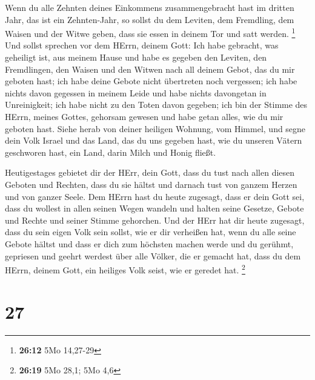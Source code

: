  Wenn du alle Zehnten deines Einkommens zusammengebracht
hast im dritten Jahr, das ist ein Zehnten-Jahr, so sollst du dem
Leviten, dem Fremdling, dem Waisen und der Witwe geben, dass sie essen
in deinem Tor und satt werden. \footnote{\textbf{26:12} 5Mo 14,27-29}
 Und sollst sprechen vor dem HErrn, deinem Gott: Ich habe
gebracht, was geheiligt ist, aus meinem Hause und habe es gegeben den
Leviten, den Fremdlingen, den Waisen und den Witwen nach all deinem
Gebot, das du mir geboten hast; ich habe deine Gebote nicht übertreten
noch vergessen;  ich habe nichts davon gegessen in meinem
Leide und habe nichts davongetan in Unreinigkeit; ich habe nicht zu den
Toten davon gegeben; ich bin der Stimme des HErrn, meines Gottes,
gehorsam gewesen und habe getan alles, wie du mir geboten hast.
 Siehe herab von deiner heiligen Wohnung, vom Himmel, und
segne dein Volk Israel und das Land, das du uns gegeben hast, wie du
unseren Vätern geschworen hast, ein Land, darin Milch und Honig fließt.

 Heutigestages gebietet dir der HErr, dein Gott, dass du
tust nach allen diesen Geboten und Rechten, dass du sie hältst und
darnach tust von ganzem Herzen und von ganzer Seele.  Dem
HErrn hast du heute zugesagt, dass er dein Gott sei, dass du wollest in
allen seinen Wegen wandeln und halten seine Gesetze, Gebote und Rechte
und seiner Stimme gehorchen.  Und der HErr hat dir heute
zugesagt, dass du sein eigen Volk sein sollst, wie er dir verheißen hat,
wenn du alle seine Gebote hältst  und dass er dich zum
höchsten machen werde und du gerühmt, gepriesen und geehrt werdest über
alle Völker, die er gemacht hat, dass du dem HErrn, deinem Gott, ein
heiliges Volk seist, wie er geredet hat. \footnote{\textbf{26:19} 5Mo
  28,1; 5Mo 4,6}

\hypertarget{section-6}{%
\section{27}\label{section-6}}

